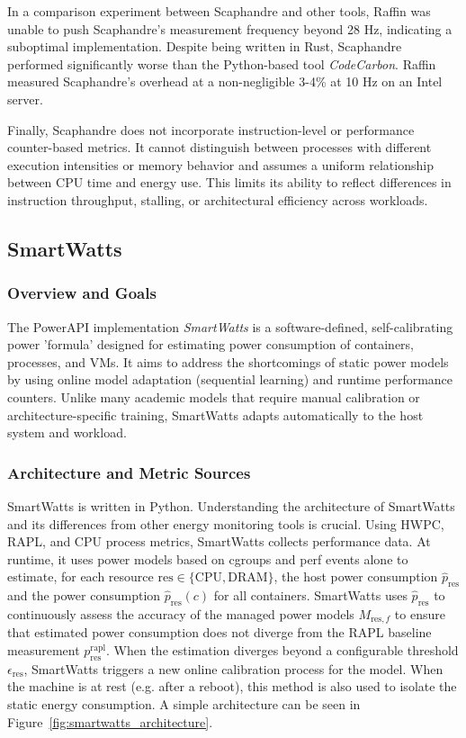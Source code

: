 In a comparison experiment between Scaphandre and other tools, Raffin\parencite{raffin2024dissecting} was unable to push Scaphandre's measurement frequency beyond 28 Hz, indicating a suboptimal implementation. Despite being written in Rust, Scaphandre performed significantly worse than the Python-based tool \textit{CodeCarbon}. Raffin measured Scaphandre's overhead at a non-negligible 3-4\% at 10 Hz on an Intel server.

Finally, Scaphandre does not incorporate instruction-level or performance counter-based metrics. It cannot distinguish between processes with different execution intensities or memory behavior and assumes a uniform relationship between CPU time and energy use. This limits its ability to reflect differences in instruction throughput, stalling, or architectural efficiency across workloads.

\subsection{SmartWatts}
\label{sec:smartwatts}
\subsubsection{Overview and Goals}
\label{sec:smartwatts-overview}
The PowerAPI implementation \textit{SmartWatts}\parencite{fieni2020smartwatts} is a software-defined, self-calibrating power 'formula' designed for estimating power consumption of containers, processes, and VMs. It aims to address the shortcomings of static power models by using online model adaptation (sequential learning) and runtime performance counters. Unlike many academic models that require manual calibration or architecture-specific training, SmartWatts adapts automatically to the host system and workload.

\subsubsection{Architecture and Metric Sources}
\label{sec:smartwatts-architecture}
SmartWatts is written in Python. Understanding the architecture of SmartWatts and its differences from other energy monitoring tools is crucial. Using HWPC, RAPL, and CPU process metrics, SmartWatts collects performance data. At runtime, it uses power models based on cgroups and perf events alone to estimate, for each resource $\text{res} \in \{\text{CPU}, \text{DRAM}\}$, the host power consumption $\hat{p}_{\text{res}}$ and the power consumption $\hat{p}_{\text{res}}(c)$ for all containers. SmartWatts uses $\hat{p}_{\text{res}}$ to continuously assess the accuracy of the managed power models $M_{\text{res}, f}$ to ensure that estimated power consumption does not diverge from the RAPL baseline measurement $p_{\text{res}}^{\text{rapl}}$. When the estimation diverges beyond a configurable threshold $\epsilon_{\text{res}}$, SmartWatts triggers a new online calibration process for the model. When the machine is at rest (e.g. after a reboot), this method is also used to isolate the static energy consumption. A simple architecture can be seen in Figure~\ref{fig:smartwatts_architecture}.

